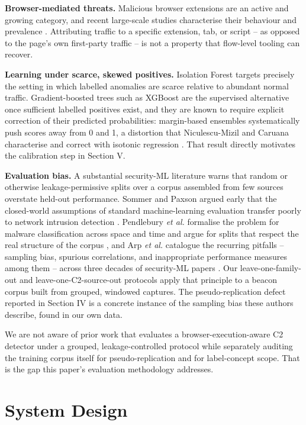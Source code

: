 \documentclass[conference,a4paper]{IEEEtran}
\begin{document}
\textbf{Browser-mediated threats.} Malicious browser extensions are an active and growing category, and recent large-scale studies characterise their behaviour and prevalence \cite{singh2025malicious}. Attributing traffic to a specific extension, tab, or script -- as opposed to the page's own first-party traffic -- is not a property that flow-level tooling can recover.

\textbf{Learning under scarce, skewed positives.} Isolation Forest \cite{liu2008isolationforest} targets precisely the setting in which labelled anomalies are scarce relative to abundant normal traffic. Gradient-boosted trees such as XGBoost \cite{chen2016xgboost} are the supervised alternative once sufficient labelled positives exist, and they are known to require explicit correction of their predicted probabilities: margin-based ensembles systematically push scores away from 0 and 1, a distortion that Niculescu-Mizil and Caruana characterise and correct with isotonic regression \cite{niculescumizil2005predicting}. That result directly motivates the calibration step in Section V.

\textbf{Evaluation bias.} A substantial security-ML literature warns that random or otherwise leakage-permissive splits over a corpus assembled from few sources overstate held-out performance. Sommer and Paxson argued early that the closed-world assumptions of standard machine-learning evaluation transfer poorly to network intrusion detection \cite{sommer2010outside}. Pendlebury \emph{et al.} formalise the problem for malware classification across space and time and argue for splits that respect the real structure of the corpus \cite{pendlebury2019tesseract}, and Arp \emph{et al.} catalogue the recurring pitfalls -- sampling bias, spurious correlations, and inappropriate performance measures among them -- across three decades of security-ML papers \cite{arp2022dos}. Our leave-one-family-out and leave-one-C2-source-out protocols apply that principle to a beacon corpus built from grouped, windowed captures. The pseudo-replication defect reported in Section IV is a concrete instance of the sampling bias these authors describe, found in our own data.

We are not aware of prior work that evaluates a browser-execution-aware C2 detector under a grouped, leakage-controlled protocol while separately auditing the training corpus itself for pseudo-replication and for label-concept scope. That is the gap this paper's evaluation methodology addresses.

\section{System Design}
\end{document}

